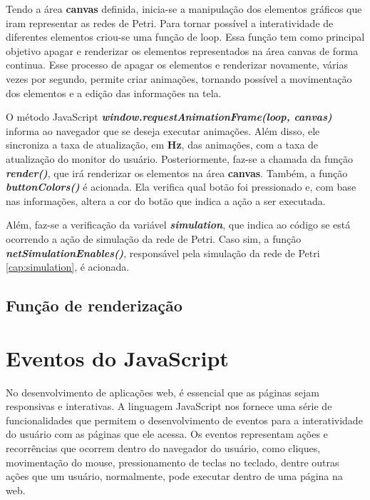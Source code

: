 \documentclass[
	12pt,				%
	openright,			%
	oneside,			%
	a4paper,			%
	english,			%
	brazil				%
	]{abntex2}
\begin{document}
Tendo a área \textbf{canvas} definida, inicia-se a manipulação dos elementos gráficos que iram representar as redes de Petri. Para tornar possível a interatividade de diferentes elementos criou-se uma função de loop. Essa função tem como principal objetivo apagar e renderizar os elementos representados na área canvas de forma continua. Esse processo de apagar os elementos e renderizar novamente, várias vezes por segundo, permite criar animações, tornando possível a movimentação dos elementos e a edição das informações na tela. 



O método JavaScript \textbf{\textit{window.requestAnimationFrame(loop, canvas)}} informa ao navegador que se deseja executar animações. Além disso, ele sincroniza a taxa de atualização, em \textbf{Hz}, das animações, com a taxa de atualização do monitor do usuário. Posteriormente, faz-se a chamada da função \textbf{\textit{render()}}, que irá renderizar os elementos na área \textbf{canvas}. Também, a função \textbf{\textit{buttonColors()}} é acionada. Ela verifica qual botão foi pressionado e, com base nas informações, altera a cor do botão que indica a ação a ser executada. 

Além, faz-se a verificação da variável \textbf{\textit{simulation}}, que indica ao código se está ocorrendo a ação de simulação da rede de Petri. Caso sim, a função \textbf{\textit{netSimulationEnables()}}, responsável pela simulação da rede de Petri \ref{cap:simulation}, é acionada.

\subsection*{Função de renderização}



\section{Eventos do JavaScript}

No desenvolvimento de aplicações web, é essencial que as páginas sejam responsivas e interativas. A linguagem JavaScript nos fornece uma série de funcionalidades que permitem o desenvolvimento de eventos para a interatividade do usuário com as páginas que ele acessa. Os eventos representam ações e recorrências que ocorrem dentro do navegador do usuário, como cliques, movimentação do mouse, pressionamento de teclas no teclado, dentre outras ações que um usuário, normalmente, pode executar dentro de uma página na web. 
\end{document}
